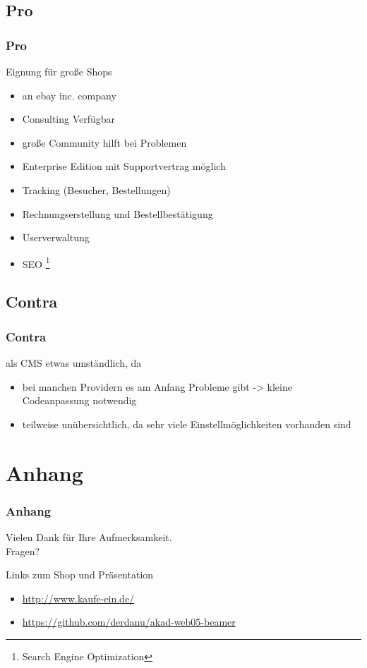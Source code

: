 \documentclass[xcolor=dvipsnames]{beamer}
\begin{document}
\subsection{Pro}
\begin{frame} %
  \frametitle{Pro} %
  \begin{block}{Eignung für große Shops}
	  \begin{itemize}
		\item an ebay inc. company
		\item Consulting Verfügbar
		\item große Community hilft bei Problemen
		\item Enterprise Edition mit Supportvertrag möglich
		\item Tracking (Besucher, Bestellungen)
		\item Rechnungserstellung und Bestellbestätigung
		\item Userverwaltung
		\item SEO \footnote{Search Engine Optimization}
	  \end{itemize}
  \end{block}
\end{frame}

\subsection{Contra}
\begin{frame} %
  \frametitle{Contra} %
  \begin{alertblock}{als CMS etwas umständlich, da }
	  \begin{itemize}
		\item bei manchen Providern es am Anfang Probleme gibt -> kleine Codeanpassung notwendig
		\item teilweise unübersichtlich, da sehr viele Einstellmöglichkeiten vorhanden sind
	  \end{itemize}
  \end{alertblock}
\end{frame}




\section{Anhang}
\begin{frame}
  \frametitle{Anhang} %
	\begin{block}{}	
		\begin{center}
			Vielen Dank für Ihre Aufmerksamkeit. \\
			Fragen?
		\end{center}	
	\end{block}
	\begin{block}{Links zum Shop und Präsentation}	
		\begin{itemize}
			\item \url{http://www.kaufe-ein.de/}					
			\item \url{https://github.com/derdanu/akad-web05-beamer}
		\end{itemize}
	\end{block}
\end{frame}
\end{document}
